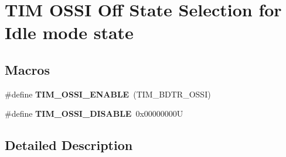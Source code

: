 \hypertarget{group___t_i_m___o_s_s_i___off___state___selection__for___idle__mode__state}{}\section{T\+IM O\+S\+SI Off State Selection for Idle mode state}
\label{group___t_i_m___o_s_s_i___off___state___selection__for___idle__mode__state}
\subsection*{Macros}
\begin{DoxyCompactItemize}
\item 
\mbox{\label{group___t_i_m___o_s_s_i___off___state___selection__for___idle__mode__state_gae5b5901b177cd054cd5503630892680f}} 
\#define {\bfseries T\+I\+M\+\_\+\+O\+S\+S\+I\+\_\+\+E\+N\+A\+B\+LE}~(T\+I\+M\+\_\+\+B\+D\+T\+R\+\_\+\+O\+S\+SI)
\item 
\mbox{\label{group___t_i_m___o_s_s_i___off___state___selection__for___idle__mode__state_gab1a20c65a3d24ef770f8a2a14c24130b}} 
\#define {\bfseries T\+I\+M\+\_\+\+O\+S\+S\+I\+\_\+\+D\+I\+S\+A\+B\+LE}~0x00000000U
\end{DoxyCompactItemize}


\subsection{Detailed Description}
